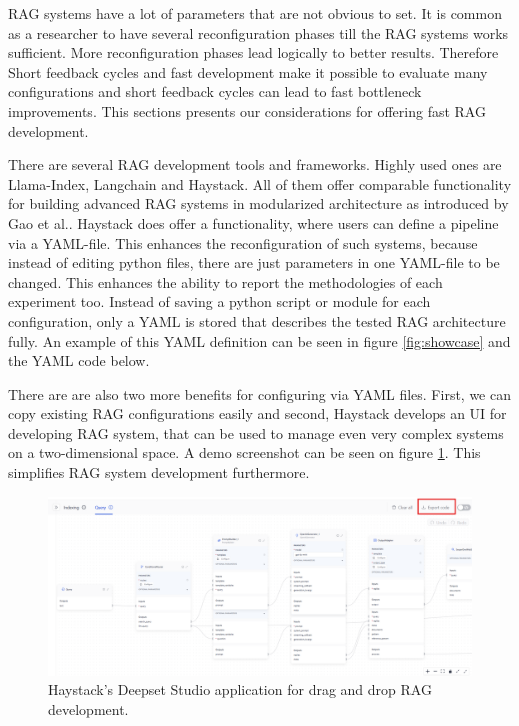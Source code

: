 RAG systems have a lot of parameters that are not obvious to set. It is common as a researcher to have several reconfiguration phases till the RAG systems works sufficient. More reconfiguration phases lead logically to better results. Therefore Short feedback cycles and fast development make it possible to evaluate many configurations and short feedback cycles can lead to fast bottleneck improvements. This sections presents our considerations for offering fast RAG development.

There are several RAG development tools and frameworks. Highly used ones are Llama-Index\cite{Liu_LlamaIndex_2022}, Langchain\cite{Chase_LangChain_2022} and Haystack\cite{Pietsch_Haystack_the_end-to-end_2019}. All of them offer comparable functionality for building advanced RAG systems in modularized architecture as introduced by Gao et al.\cite{Gao.18.12.2023}. Haystack does offer a functionality, where users can define a pipeline via a YAML-file. This enhances the reconfiguration of such systems, because instead of editing python files, there are just parameters in one YAML-file to be changed. This enhances the ability to report the methodologies of each experiment too. Instead of saving a python script or module for each configuration, only a YAML is stored that describes the tested RAG architecture fully. An example of this YAML definition can be seen in figure \ref{fig:showcase} and the YAML code below.

There are are also two more benefits for configuring via YAML files. First, we can copy existing RAG configurations easily and second, Haystack develops an UI for developing RAG system, that can be used to manage even very complex systems on a two-dimensional space. A demo screenshot can be seen on figure \ref{fig:deepsetstudio}. This simplifies RAG system development furthermore.


\begin{figure}[b]
  \centering
  \includegraphics[width=\textwidth]{images/deepset-studio-zoomed-in.png}
  \caption{Haystack's Deepset Studio application for drag and drop RAG development.\cite{deepsetstudio.10.03.2025}}
  \label{fig:deepsetstudio}
\end{figure}


